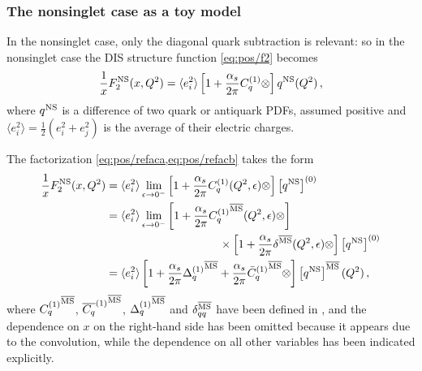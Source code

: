 \subsubsection{The nonsinglet case as a toy model}
\label{sec:nonsing}

In the nonsinglet case, only the diagonal quark subtraction is relevant: so in
the nonsinglet case the DIS structure function \cref{eq:pos/f2} becomes
\begin{equation}\label{eq:pos/disfact}
 \frac{1}{x} F_2^{{\textrm{NS}}}(x,Q^2)= \langle e_i^2\rangle \left[1
 +\frac{\alpha_s}{2\pi}  C^{(1)}_q \otimes \right] q^{{\textrm{NS}}}(Q^2) \,,
\end{equation}
where $q^{{\textrm{NS}}}$ is a difference of two quark or antiquark PDFs, assumed
positive and
$\langle
e^2_i\rangle=\frac{1}{2} \left(e^2_i+e^2_j\right)$ is the average of
their electric charges. 

The factorization \cref{eq:pos/refaca,eq:pos/refacb} takes the
form
\begin{align}
  \frac{1}{x} F_2^{{\textrm{NS}}}(x,Q^2)&= \langle e_i^2\rangle
\lim_{\epsilon\to
  0^-}\left[1
    +\frac{\alpha_s}{2\pi} C_{q}^{(1)}(Q^2,\epsilon) \otimes \right] 
    \left[{q^{{\textrm{NS}}}}\right]^{(0)} \label{eq:pos/dismsbar} \\
&= \langle e_i^2\rangle
\lim_{\epsilon\to
  0^-}\left[1 +\frac{\alpha_s}{2\pi} {C_{q}^{(1)}}^{{\overline{\textrm{MS}}}}(Q^2, \epsilon) \otimes \right]
  \nonumber\\
  &\qquad\qquad\qquad\qquad\qquad
    \times\left[1 +\frac{\alpha_s}{2\pi} \delta^{{\overline{\textrm{MS}}}} (Q^2,\epsilon) \otimes \right]
     \left[{q^{{\textrm{NS}}}}\right]^{(0)} \label{eq:pos/dismsbar1} \\
    &=  \langle e_i^2\rangle
\left[1+ \frac{\alpha_s}{2\pi} {\Delta^{(1)}_q}^{{\overline{\textrm{MS}}}}
  +\frac{\alpha_s}{2\pi}    {\bar{C}_{q}^{(1)}{}}^{{\overline{\textrm{MS}}}} \otimes
  \right] 
     \left[{q^{{\textrm{NS}}}}\right]^{{\overline{\textrm{MS}}}}(Q^2) \,, \label{eq:pos/dismsbar2}
\end{align}
where $ {C_{q}^{(1)}}^{{\overline{\textrm{MS}}}}$,  ${\overline{C_{q}}^{(1)}}^{{\overline{\textrm{MS}}}}$,
${\Delta^{(1)}_q}^{{\overline{\textrm{MS}}}}$ and $ \delta_{qq}^{{\overline{\textrm{MS}}}} $ have been
defined in ,
and the dependence on $x$ on the  right-hand side has been omitted
because it appears due to the convolution, while the dependence on all
other variables has been indicated explicitly.

